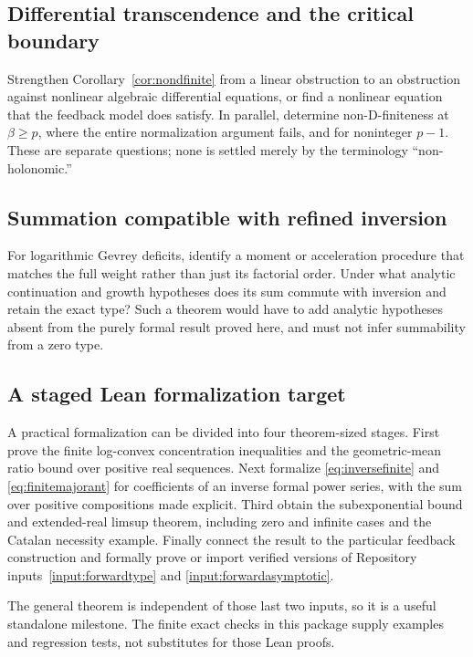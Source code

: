 \documentclass[11pt,a4paper]{article}
\numberwithin{equation}{section}
\theoremstyle{definition}
\theoremstyle{remark}
\begin{document}
\subsection{Differential transcendence and the critical boundary}

Strengthen Corollary~\ref{cor:nondfinite} from a linear obstruction to
an obstruction against nonlinear algebraic differential equations, or
find a nonlinear equation that the feedback model does satisfy. In
parallel, determine non-D-finiteness at $\beta\ge p$, where the entire
normalization argument fails, and for noninteger $p-1$. These are
separate questions; none is settled merely by the terminology
``non-holonomic.''

\subsection{Summation compatible with refined inversion}

For logarithmic Gevrey deficits, identify a moment or acceleration
procedure that matches the full weight rather than just its factorial
order. Under what analytic continuation and growth hypotheses does its
sum commute with inversion and retain the exact type? Such a theorem
would have to add analytic hypotheses absent from the purely formal
result proved here, and must not infer summability from a zero type.

\subsection{A staged Lean formalization target}

A practical formalization can be divided into four theorem-sized stages.
First prove the finite log-convex concentration inequalities and the
geometric-mean ratio bound over positive real sequences. Next formalize
\eqref{eq:inversefinite} and \eqref{eq:finitemajorant} for coefficients
of an inverse formal power series, with the sum over positive
compositions made explicit. Third obtain the subexponential bound and
extended-real limsup theorem, including zero and infinite cases and the
Catalan necessity example. Finally connect the result to the particular
feedback construction and formally prove or import verified versions of
Repository inputs~\ref{input:forwardtype} and
\ref{input:forwardasymptotic}.

The general theorem is independent of those last two inputs, so it is a
useful standalone milestone. The finite exact checks in this package
supply examples and regression tests, not substitutes for those Lean
proofs.
\end{document}
